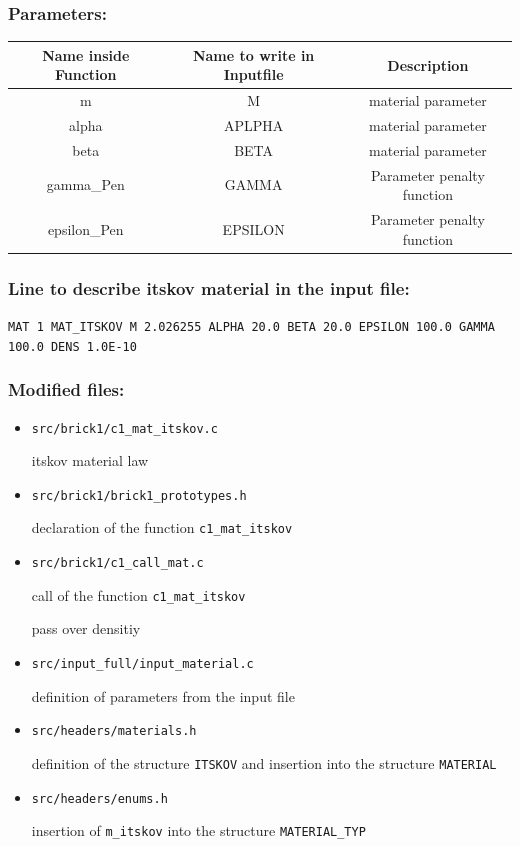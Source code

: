 \subsubsection*{Parameters:}
\begin{tabular}{|c|c|c|}
	\hline
	Name inside Function	& Name to write in Inputfile	& Description \\ \hline \hline
	m		& M		& material parameter \\ \hline
	alpha		& APLPHA 	& material parameter\\ \hline
	beta		& BETA 		& material parameter \\ \hline
	gamma\_Pen	& GAMMA	 	& Parameter penalty function\\ \hline
	epsilon\_Pen	& EPSILON	 & Parameter penalty function\\ \hline
\end{tabular}

\subsubsection*{Line to describe itskov material in the input file:}
{\tt MAT 1 MAT\_ITSKOV  M 2.026255 ALPHA 20.0 BETA 20.0 EPSILON 100.0 GAMMA 100.0 DENS 1.0E-10}

\subsubsection*{Modified files:}
\begin{itemize}
	\item {\tt src/brick1/c1\_mat\_itskov.c}
	\par \noindent itskov material law 	
	\item {\tt src/brick1/brick1\_prototypes.h}
	\par \noindent declaration of the function {\tt c1\_mat\_itskov}	
	\item {\tt src/brick1/c1\_call\_mat.c}
	\par \noindent call of the function {\tt c1\_mat\_itskov}
	\par \noindent pass over densitiy
	\item {\tt src/input\_full/input\_material.c}
	\par \noindent definition of parameters from the input file
	\item {\tt src/headers/materials.h}
	\par \noindent definition of the structure {\tt ITSKOV} and insertion into the structure {\tt MATERIAL}
	\item {\tt src/headers/enums.h}
	\par \noindent insertion of {\tt m\_itskov} into the structure {\tt MATERIAL\_TYP}
\end{itemize}



